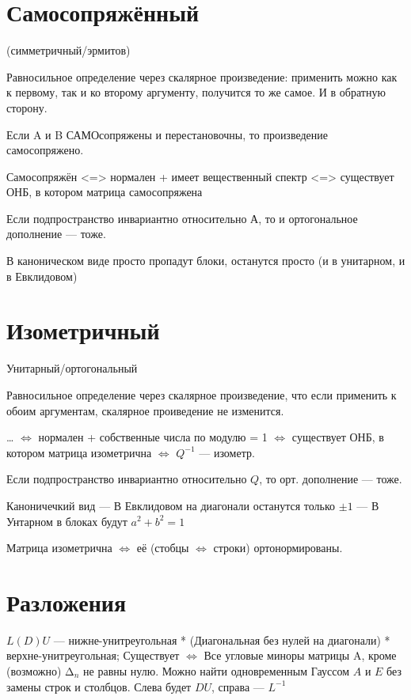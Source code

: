 \documentclass[12pt, a4paper]{article}
\begin{document}
    \section{Самосопряжённый}

    (симметричный/эрмитов)

    Равносильное определение через скалярное произведение: применить можно как к первому, так и ко второму аргументу, получится то же самое.
    И в обратную сторону.

    Если A и B САМОсопряжены и перестановочны, то произведение самосопряжено.

    Самосопряжён 
    <=> нормален + имеет вещественный спектр
    <=> существует ОНБ, в котором матрица самосопряжена

    Если подпространство инвариантно относительно А, то и ортогональное дополнение — тоже.

    В каноническом виде просто пропадут блоки, останутся просто (и в унитарном, и в Евклидовом)


    \section{Изометричный}

    Унитарный/ортогональный

    Равносильное определение через скалярное произведение, что если применить к обоим аргументам, скалярное проиведение не изменится.



    …
    $\Longleftrightarrow$ нормален + собственные числа по модулю = 1
    $\Longleftrightarrow$ существует ОНБ, в котором матрица изометрична
    $\Longleftrightarrow$ $Q^{-1}$ — изометр.

    Если подпространство инвариантно относительно $Q$, то орт. дополнение — тоже.
    
    Каноничечкий вид
    — В Евклидовом на диагонали останутся только $± 1$
    — В Унтарном в блоках будут $a^2 + b^2 = 1$

    Матрица изометрична $\Longleftrightarrow$ её (стобцы $\Longleftrightarrow$ строки) ортонормированы.


    \section{Разложения}

    $L(D)U$ — нижне-унитреугольная * (Диагональная без нулей на диагонали) * верхне-унитреугольная; 
    Существует $\Longleftrightarrow$ Все угловые миноры матрицы A, кроме (возможно) $∆_n$ не равны нулю. 
    Можно найти одновременным Гауссом $A$ и $E$ без замены строк и столбцов. Слева будет $DU$, справа — $L^{-1}$
\end{document}
